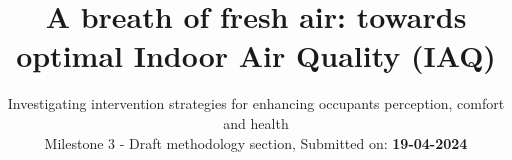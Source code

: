 \title{A breath of fresh air: towards optimal Indoor Air Quality (IAQ)}
\subtitle{Investigating intervention strategies for enhancing occupants perception, comfort and health\\ Milestone 3 - Draft methodology section, Submitted on: \textbf{19-04-2024}}